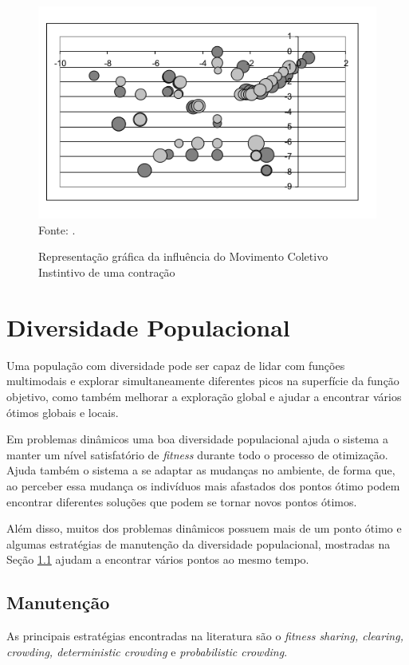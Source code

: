 \begin{figure}[!htb]
	\caption{Representação gráfica da influência do Movimento Coletivo Instintivo de uma contração}
	\centering
	\includegraphics[scale=0.5]{images/movimento_volatil.png}
	\label{fig:volitute_moviment}{\\Fonte: .}
\end{figure}

\section{Diversidade Populacional}
\label{sec:population_diversity}
Uma população com diversidade pode ser capaz de lidar com funções multimodais e explorar simultaneamente diferentes picos na superfície da função objetivo, como também melhorar a exploração global e ajudar a encontrar vários ótimos globais e locais.

Em problemas dinâmicos uma boa diversidade populacional ajuda o sistema a manter um nível satisfatório de \textit{fitness} durante todo o processo de otimização. Ajuda também o sistema a se adaptar as mudanças no ambiente, de forma que, ao perceber essa mudança os indivíduos mais afastados dos pontos ótimo podem encontrar diferentes soluções que podem se tornar novos pontos ótimos.

Além disso, muitos dos problemas dinâmicos possuem mais de um ponto ótimo e algumas estratégias de manutenção da diversidade populacional, mostradas na Seção \ref{sec:maintain_diversity} ajudam a encontrar vários pontos ao mesmo tempo.

\subsection{Manutenção}
\label{sec:maintain_diversity}
As principais estratégias encontradas na literatura são o \textit{fitness sharing, clearing, crowding, deterministic crowding} e \textit{probabilistic crowding}.

